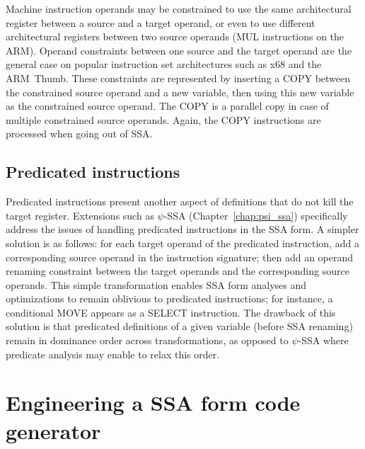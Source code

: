 Machine instruction operands may be constrained to use the same
architectural register between a source and a target operand, or even to use
different architectural registers between two source operands (MUL
instructions on the ARM). Operand constraints between one source and the
target operand are the general case on popular instruction set architectures such as
x68 and the ARM~Thumb. These constraints are represented by inserting a COPY
between the constrained source operand and a new variable, then using this new
variable as the constrained source operand. The COPY is a parallel copy in case of
multiple constrained source operands. Again, the COPY instructions are processed when
going out of SSA.

\subsection{Predicated instructions}

Predicated instructions present another aspect of definitions that do not
kill the target register. Extensions such as $\psi$-SSA
(Chapter~\ref{chap:psi_ssa}) specifically address the issues of handling
predicated instructions in the SSA form. A simpler solution is as follows: for
each target operand of the predicated instruction, add a corresponding source
operand in the instruction signature; then add an operand renaming constraint
between the target operands and the corresponding source operands. This simple
transformation enables SSA form analyses and optimizations to remain oblivious
to predicated instructions; for instance, a conditional MOVE appears as a SELECT
instruction. The drawback of this solution is that predicated definitions of a
given variable (before SSA renaming) remain in dominance order across
transformations, as opposed to $\psi$-SSA where predicate analysis may enable to
relax this order.


\section{Engineering a SSA form code generator}
\label{sec:ssa-codegen-engineering}

